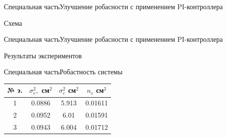 \begin{frame}{Специальная часть}{Улучшение робасности с применением PI-контроллера}
    \begin{block}{Схема}
    \end{block}
\end{frame}

\begin{frame}{Специальная часть}{Улучшение робасности с применением PI-контроллера}
    \begin{block}{Результаты экспериментов}
    \end{block}
\end{frame}


\begin{frame}{Специальная часть}{Робастность системы}

\begin{table}[H]
    \begin{tabular}{|c|c|c|c|}
        \hline 
        № э.& $\sigma^2_e,$ см$^2$ & $\sigma^2_c$ см$^2$ & $n_e$ см$^2$ \\ \hline 
        1& 0.0886 & 5.913 & 0.01611\\ \hline
        2& 0.0952 & 6.01  & 0.01591 \\ \hline
        3& 0.0943 & 6.004 & 0.01712\\ \hline

    \end{tabular}
\end{table}
\end{frame}
 
